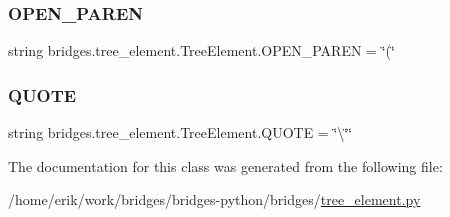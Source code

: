 \subsubsection{\texorpdfstring{O\+P\+E\+N\+\_\+\+P\+A\+R\+EN}{OPEN\_PAREN}}
{\footnotesize\ttfamily string bridges.\+tree\+\_\+element.\+Tree\+Element.\+O\+P\+E\+N\+\_\+\+P\+A\+R\+EN = \char`\"{}(\char`\"{}\hspace{0.3cm}{\ttfamily [static]}}

\mbox{\label{classbridges_1_1tree__element_1_1_tree_element_aa5a4d14f38ceb896a85ef0b703d6995a}} 
\subsubsection{\texorpdfstring{Q\+U\+O\+TE}{QUOTE}}
{\footnotesize\ttfamily string bridges.\+tree\+\_\+element.\+Tree\+Element.\+Q\+U\+O\+TE = \char`\"{}\textbackslash{}\char`\"{}\char`\"{}\hspace{0.3cm}{\ttfamily [static]}}



The documentation for this class was generated from the following file\+:\begin{DoxyCompactItemize}
\item 
/home/erik/work/bridges/bridges-\/python/bridges/\hyperlink{tree__element_8py}{tree\+\_\+element.\+py}\end{DoxyCompactItemize}
